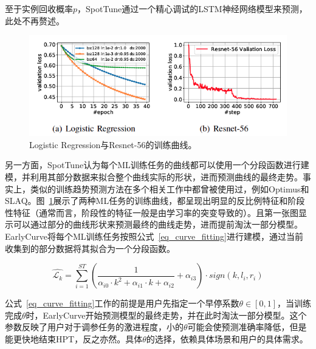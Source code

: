 至于实例回收概率$p$，SpotTune通过一个精心调试的LSTM神经网络模型来预测，此处不再赘述。

\begin{figure}[h]
    \centerline{\includegraphics[width=\textwidth]{figures/lr-res56-loss.png}}
    \caption{Logistic Regression与Resnet-56的训练曲线。}
    \label{lr_res56_loss}
\end{figure}


另一方面，SpotTune认为每个ML训练任务的曲线都可以使用一个分段函数进行建模，并利用其部分数据来拟合整个曲线实际的形状，进而预测曲线的最终走势。事实上，类似的训练趋势预测方法在多个相关工作中都曾被使用过，例如Optimus\parencite{peng2018optimus}和SLAQ\parencite{zhang2017slaq}。图~\ref{lr_res56_loss}展示了两种ML任务的训练曲线，都呈现出明显的反比例特征和阶段性特征（通常而言，阶段性的特征一般是由学习率的突变导致的）。且第一张图显示可以通过部分的曲线形状来预测最终的曲线走势，进而提前淘汰一部分模型。EarlyCurve将每个ML训练任务按照公式~\ref{eq_curve_fitting}进行建模，通过当前收集到的部分数据将其拟合为一个分段函数。

\begin{equation}\label{eq_curve_fitting}
	\hat{\mathcal{L}_k} = \sum_{i=1}^{ST}(\frac{1}{\alpha_{i0} \cdot k^2 + \alpha_{i1} \cdot k + \alpha_{i2}} + \alpha_{i3}) \cdot sign(k, l_i, r_i)
\end{equation}

公式~\ref{eq_curve_fitting}工作的前提是用户先指定一个早停系数$\theta \in [0, 1]$，当训练完成$\theta$时，EarlyCurve开始预测模型的最终走势，并在此时淘汰一部分模型。这个参数反映了用户对于调参任务的激进程度，小的$\theta$可能会使预测准确率降低，但是能更快地结束HPT，反之亦然。具体$\theta$的选择，依赖具体场景和用户的具体需求。

